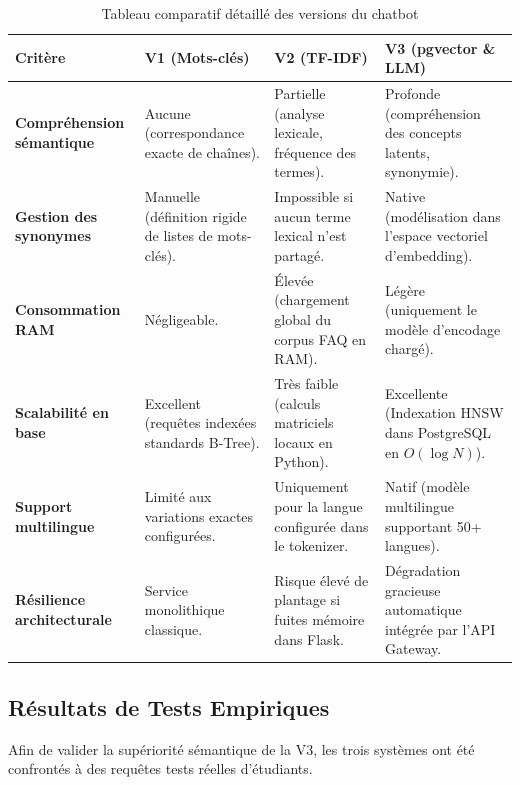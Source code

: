 \documentclass[11pt,a4paper]{article}
\begin{document}
\begin{table}[H]
\centering
\small
\begin{tabular}{p{3.5cm}p{3.5cm}p{3.5cm}p{4cm}}
\toprule
\textbf{Critère} & \textbf{V1 (Mots-clés)} & \textbf{V2 (TF-IDF)} & \textbf{V3 (pgvector \& LLM)} \\
\midrule
\rowcolor{gray!10}
\textbf{Compréhension sémantique} & Aucune (correspondance exacte de chaînes). & Partielle (analyse lexicale, fréquence des termes). & Profonde (compréhension des concepts latents, synonymie). \\
\textbf{Gestion des synonymes} & Manuelle (définition rigide de listes de mots-clés). & Impossible si aucun terme lexical n'est partagé. & Native (modélisation dans l'espace vectoriel d'embedding). \\
\rowcolor{gray!10}
\textbf{Consommation RAM} & Négligeable. & Élevée (chargement global du corpus FAQ en RAM). & Légère (uniquement le modèle d'encodage chargé). \\
\textbf{Scalabilité en base} & Excellent (requêtes indexées standards B-Tree). & Très faible (calculs matriciels locaux en Python). & Excellente (Indexation HNSW dans PostgreSQL en $O(\log N)$). \\
\rowcolor{gray!10}
\textbf{Support multilingue} & Limité aux variations exactes configurées. & Uniquement pour la langue configurée dans le tokenizer. & Natif (modèle multilingue supportant 50+ langues). \\
\textbf{Résilience architecturale} & Service monolithique classique. & Risque élevé de plantage si fuites mémoire dans Flask. & Dégradation gracieuse automatique intégrée par l'API Gateway. \\
\bottomrule
\end{tabular}
\caption{Tableau comparatif détaillé des versions du chatbot}
\end{table}

\subsection{Résultats de Tests Empiriques}
Afin de valider la supériorité sémantique de la V3, les trois systèmes ont été confrontés à des requêtes tests réelles d'étudiants.
\end{document}
